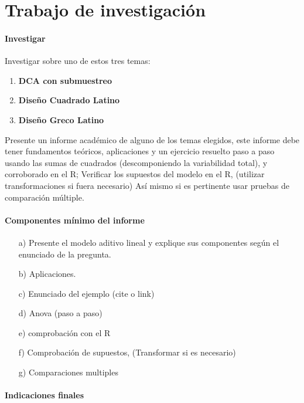\newpage
\chapter{Trabajo de investigación}

\subsubsection{Investigar}

Investigar sobre uno de estos tres temas:

\begin{enumerate}
  \item \textbf{DCA con submuestreo}
  \item \textbf{Diseño Cuadrado Latino}
  \item \textbf{Diseño Greco Latino}
\end{enumerate}

Presente un informe académico de alguno de los temas elegidos, este informe debe tener fundamentos teóricos, aplicaciones y un ejercicio resuelto paso a paso usando las sumas de cuadrados (descomponiendo la variabilidad total), y corroborado en el R; Verificar los supuestos del modelo en el R, (utilizar transformaciones si fuera necesario) Así mismo si es pertinente usar pruebas de comparación múltiple.

\subsubsection{Componentes mínimo del informe}

\begin{itemize}
  \item[a)] Presente el modelo aditivo lineal y explique sus componentes según el enunciado de la pregunta.
  \item[b)] Aplicaciones.
  \item[c)] Enunciado del ejemplo (cite o link) 
  \item[d)] Anova (paso a paso)
  \item[e)] comprobación con el R
  \item[f)] Comprobación de supuestos, (Transformar si es necesario)
  \item[g)] Comparaciones multiples
\end{itemize}

\subsubsection{Indicaciones finales}


